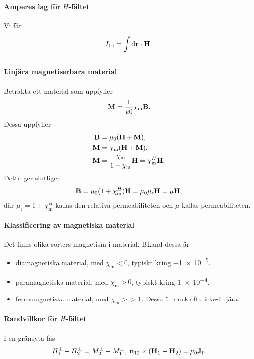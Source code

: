 \paragraph{Amperes lag för $H$-fältet}
Vi får
\begin{align*}
	I_{\text{fri}} = \int\limits_{}^{}\dd{\vb{r}}\cdot \vb{H}.
\end{align*}

\paragraph{Linjära magnetiserbara material}
Betrakta ett material som uppfyller
\begin{align*}
	\vb{M} = \frac{1}{\mu{0}}\chi_{\text{m}}\vb{B}.
\end{align*}
Dessa uppfyller
\begin{align*}
	\vb{B} &= \mu_{0}(\vb{H} + \vb{M}), \\
	\vb{M} &= \chi_{\text{m}}(\vb{H} + \vb{M}), \\
	\vb{M} &= \frac{\chi_{\text{m}}}{1 - \chi_{\text{m}}}\vb{H} = \chi_{\text{m}}^{H}\vb{H}.
\end{align*}
Detta ger slutligen
\begin{align*}
	\vb{B} = \mu_{0}(1 + \chi_{\text{m}}^{H})\vb{H} = \mu_{0}\mu_{\text{r}}\vb{H} = \mu\vb{H},
\end{align*}
där $\mu_{\text{r}} = 1 + \chi_{\text{m}}^{H}$ kallas den relativa permeabiliteten och $\mu$ kallas permeabiliteten.

\paragraph{Klassificering av magnetiska material}
Det finns olika sorters magnetism i material. BLand dessa är:
\begin{itemize}
	\item diamagnetiska material, med $\chi_{\text{m}} < 0$, typiskt kring \num{-1e-5}.
	\item paramagnetiska material, med $\chi_{\text{m}} > 0$, typiskt kring \num{1e-4}.
	\item ferromagnetiska material, med $\chi_{\text{m}} >> 1$. Dessa är dock ofta icke-linjära.
\end{itemize}

\paragraph{Randvillkor för $H$-fältet}
I en gränsyta fås
\begin{align*}
	H_{1}^{\perp} - H_{2}^{\perp} = M_{2}^{\perp} - M_{1}^{\perp},\ \vb{n}_{12}\times(\vb{H}_{1} - \vb{H}_{2}) = \mu_{0}\vb{J}_{\text{f}}.
\end{align*}

